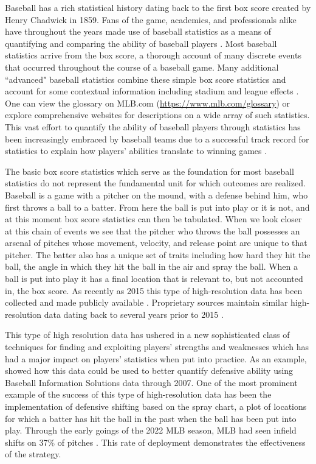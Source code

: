 \documentclass[12pt]{article}
\begin{document}
Baseball has a rich statistical history dating back to the first box score created by Henry Chadwick in 1859. Fans of the game, academics, and professionals alike have throughout the years made use of baseball statistics as a means of quantifying and comparing the ability of baseball players \citep{berry1999bridging, schwarz2004numbers, albert2006pitching, brown2008season, jensen2009hierarchical, jensen2009bayesball, piette2012estimating, baumer2015openwar, marchi2019analyzing}. Most baseball statistics arrive from the box score, a thorough account of many discrete events that occurred throughout the course of a baseball game. Many additional ``advanced" baseball statistics combine these simple box score statistics and account for some contextual information including stadium and league effects \citep{marchi2019analyzing}. One can view the glossary on MLB.com (\url{https://www.mlb.com/glossary}) or explore comprehensive websites \citep{bref, fangraphs, bp} for descriptions on a wide array of such statistics. This vast effort to quantify the ability of baseball players through statistics has been increasingly embraced by baseball teams due to a successful track record for statistics to explain how players' abilities translate to winning games \citep{lewis2004moneyball}.

The basic box score statistics which serve as the foundation for most baseball statistics do not represent the fundamental unit for which outcomes are realized. Baseball is a game with a pitcher on the mound, with a defense behind him, who first throws a ball to a batter. From here the ball is put into play or it is not, and at this moment box score statistics can then be tabulated. When we look closer at this chain of events we see that the pitcher who throws the ball possesses an arsenal of pitches whose movement, velocity, and release point are unique to that pitcher. The batter also has a unique set of traits including how hard they hit the ball, the angle in which they hit the ball in the air and spray the ball. When a ball is put into play it has a final location that is relevant to, but not accounted in, the box score. As recently as 2015 this type of high-resolution data has been collected and made publicly available \citep{statcast}. Proprietary sources maintain similar high-resolution data dating back to several years prior to 2015 \citep{BIS}.

This type of high resolution data has ushered in a new sophisticated class of techniques for finding and exploiting players' strengths and weaknesses which has had a major impact on players' statistics when put into practice. As an example, \cite{jensen2009bayesball} showed how this data could be used to better quantify defensive ability using Baseball Information Solutions data through 2007. One of the most prominent example of the success of this type of high-resolution data has been the implementation of defensive shifting based on the spray chart, a plot of locations for which a batter has hit the ball in the past when the ball has been put into play. Through the early goings of the 2022 MLB season, MLB had seen infield shifts on 37\% of pitches \citep{baccellieri2022infield}. This rate of deployment demonstrates the effectiveness of the strategy.
\end{document}
